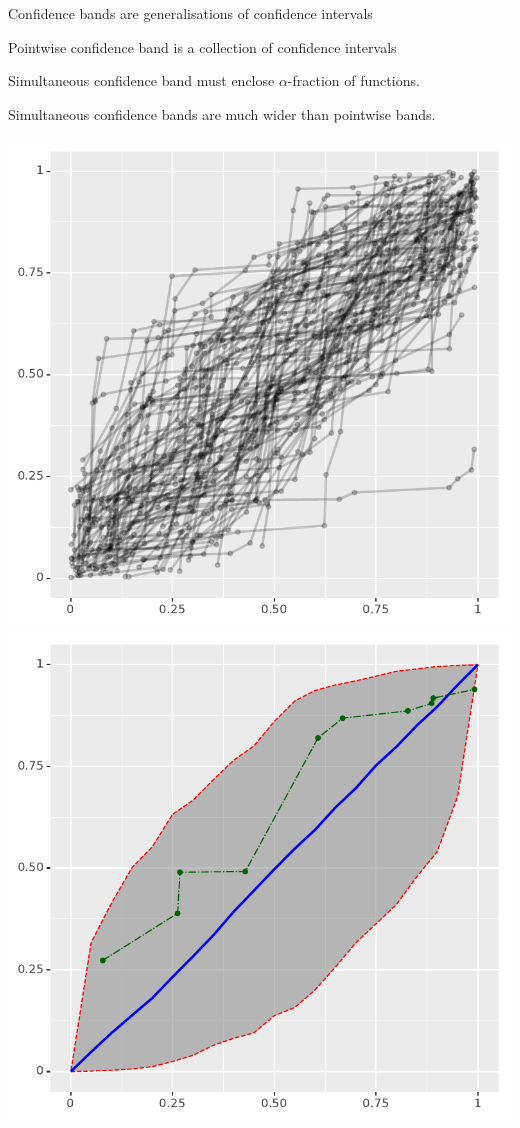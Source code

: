 \documentclass[landscape,footrule]{foils}
\begin{document}
Confidence bands are generalisations of confidence intervals
\begin{triangles}
\item Pointwise confidence band is a collection of confidence intervals
\item Simultaneous confidence band must enclose $\alpha$-fraction of functions.  
\item Simultaneous confidence bands are much wider than pointwise bands.  
\end{triangles}


\enlargethispage{0.5cm}
\centerline{
\includegraphics[scale=0.8]{qq_line_distribution}
\includegraphics[scale=0.8]{qq_confidence_envelope}}
\end{document}
